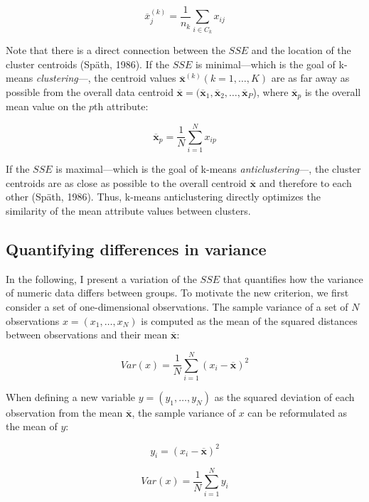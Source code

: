 \documentclass[
  man,floatsintext]{apa7}
\begin{document}
\[
\overline{x}_j ^{(k)} = \frac{1}{n_k} \sum\limits_{i \in C_k} x_{ij}
\]

Note that there is a direct connection between the \(\mathit{SSE}\) and the location of the cluster centroids (Späth, 1986). If the \(\mathit{SSE}\) is minimal---which is the goal of k-means \emph{clustering}---, the centroid values \(\overline{\mathbf{x}}^{(k)} (k = 1, \ldots, K)\) are as far away as possible from the overall data centroid \(\overline{\mathbf{x}} = (\overline{\mathbf{x}}_1, \overline{\mathbf{x}}_2, \ldots, \overline{\mathbf{x}}_P\)), where \(\overline{\mathbf{x}}_p\) is the overall mean value on the \(p\)th attribute:

\[
\overline{\mathbf{x}}_p = \frac{1}{N} \sum\limits_{i=1}^{N} x_{ip}
\]

If the \(\mathit{SSE}\) is maximal---which is the goal of k-means \emph{anticlustering}---, the cluster centroids are as close as possible to the overall centroid \(\overline{\mathbf{x}}\) and therefore to each other (Späth, 1986). Thus, k-means anticlustering directly optimizes the similarity of the mean attribute values between clusters.

\hypertarget{quantifying-differences-in-variance}{%
\subsection{Quantifying differences in variance}\label{quantifying-differences-in-variance}}

In the following, I present a variation of the \(\mathit{SSE}\) that quantifies how the variance of numeric data differs between groups. To motivate the new criterion, we first consider a set of one-dimensional observations. The sample variance of a set of \(N\) observations \(x = (x_1, \ldots, x_N)\) is computed as the mean of the squared distances between observations and their mean \(\overline{\mathbf{x}}\):

\[
\mathit{Var(x)} = \frac{1}{N} \sum\limits_{i=1}^{N} (x_i - \overline{\mathbf{x}})^2
\]

When defining a new variable \(y = (y_1, \ldots, y_N)\) as the squared deviation of each observation from the mean \(\overline{\mathbf{x}}\), the sample variance of \(x\) can be reformulated as the mean of \(y\):

\[
y_i = (x_i - \overline{\mathbf{x}})^2
\]

\[
\mathit{Var(x)} = \frac{1}{N} \sum\limits_{i=1}^{N} y_i
\]
\end{document}
